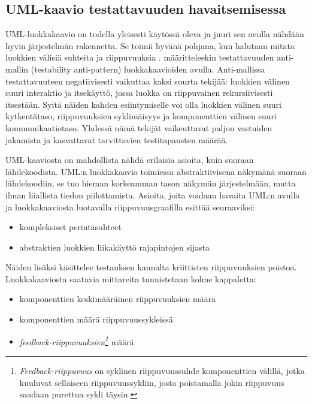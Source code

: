 \documentclass[finnish]{tktltiki2}
\theoremstyle{definition}
\theoremstyle{remark}
\begin{document}
\subsection{UML-kaavio testattavuuden havaitsemisessa}

UML-luokkakaavio on todella yleisesti käytössä oleva ja juuri sen avulla nähdään hyvin järjestelmän rakennetta. Se toimii hyvänä pohjana, kun halutaan mitata luokkien välisiä suhteita ja riippuvuuksia \citep[s. ]{baudry_testability_2002}. \citep[s. 3]{baudry_measuring_2003} määritteleekin testattavuuden anti-mallin (testability anti-pattern) luokkakaavioiden avulla. Anti-mallissa testattavuuteen negatiivisesti vaikuttaa kaksi suurta tekijää: luokkien välinen suuri interaktio ja itsekäyttö, jossa luokka on riippuvainen rekursiivisesti itsestään. Syitä näiden kahden esiintymiselle voi olla luokkien välinen suuri kytkentätaso, riippuvuuksien syklimäisyys ja komponenttien välinen suuri kommunikaatiotaso. Yhdessä nämä tekijät vaikeuttavat paljon vastuiden jakamista ja kasvattavat tarvittavien testitapausten määrää. 


UML-kaaviosta on mahdollista nähdä erilaisia asioita, kuin suoraan lähdekoodista. UML:n luokkakaavio toimiessa abstraktiivisena näkymänä suoraan lähdekoodiin, se tuo hieman korkeamman tason näkymän järjestelmään, mutta ilman liiallista tiedon piilottamista. Asioita, joita voidaan havaita UML:n avulla ja luokkakaaviosta luotavalla riippuvuusgraafilla esittää \citep{baudry_testability_2002} seuraaviksi:

\begin{itemize} 
	\item kompleksiset perintäsuhteet
	\item abstraktien luokkien liikakäyttö rajapintojen sijasta
\end{itemize}


Näiden lisäksi \citep{Jungmayr:2002} käsittelee testauksen kannalta kriittisten riippuvuuksien poistoa. Luokkakaaviosta saatavia mittareita tunnistetaan kolme kappaletta: 

\begin{itemize}
	\item komponenttien keskimääräinen riippuvuuksien määrä
	\item komponenttien määrä riippuvuussykleissä
	\item \textit{feedback-riippuvuuksien\footnote{\textit{Feedback-riippuvuus} on syklinen riippuvuussuhde komponenttien välillä, jotka kuuluvat sellaiseen riippuvuussykliin, josta poistamalla jokin riippuvuus saadaan purettua sykli täysin.}}  määrä 
\end{itemize}
\end{document}
